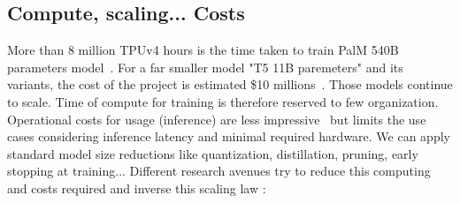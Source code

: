 \documentclass[acmsmall]{acmart}
\begin{document}
\subsection{Compute, scaling... Costs}
More than 8 million TPUv4 hours is the time taken to train PalM 540B parameters model~\citep{tayTranscendingScalingLaws2022}. For a far smaller model "T5 11B paremeters" and its variants, the cost of the project is estimated \$10 millions~\citep{sharirCostTrainingNLP2020}. Those models continue to scale. Time of compute for training is therefore reserved to few organization. Operational costs for usage (inference) are less impressive~\citep{liangetal.HolisticEvaluationLanguage2022} but limits the use cases considering inference latency and minimal required hardware. We can apply standard model size reductions like quantization, distillation, pruning, early stopping at training... Different research avenues try to reduce this computing and costs required and inverse this scaling law :
\end{document}
